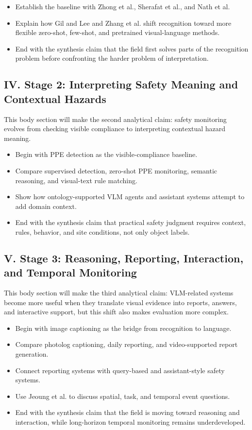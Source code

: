 \documentclass[10pt, letterpaper]{article}
\begin{document}
\begin{itemize}
\item Establish the baseline with Zhong et al., Sherafat et al., and Nath et al.
\item Explain how Gil and Lee and Zhang et al. shift recognition toward more flexible zero-shot, few-shot, and pretrained visual-language methods.
\item End with the synthesis claim that the field first solves parts of the recognition problem before confronting the harder problem of interpretation.
\end{itemize}

\subsection{IV. Stage 2: Interpreting Safety Meaning and Contextual Hazards}

This body section will make the second analytical claim: safety monitoring evolves from checking visible compliance to interpreting contextual hazard meaning.

\begin{itemize}
\item Begin with PPE detection as the visible-compliance baseline.
\item Compare supervised detection, zero-shot PPE monitoring, semantic reasoning, and visual-text rule matching.
\item Show how ontology-supported VLM agents and assistant systems attempt to add domain context.
\item End with the synthesis claim that practical safety judgment requires context, rules, behavior, and site conditions, not only object labels.
\end{itemize}

\subsection{V. Stage 3: Reasoning, Reporting, Interaction, and Temporal Monitoring}

This body section will make the third analytical claim: VLM-related systems become more useful when they translate visual evidence into reports, answers, and interactive support, but this shift also makes evaluation more complex.

\begin{itemize}
\item Begin with image captioning as the bridge from recognition to language.
\item Compare photolog captioning, daily reporting, and video-supported report generation.
\item Connect reporting systems with query-based and assistant-style safety systems.
\item Use Jeoung et al. to discuss spatial, task, and temporal event questions.
\item End with the synthesis claim that the field is moving toward reasoning and interaction, while long-horizon temporal monitoring remains underdeveloped.
\end{itemize}
\end{document}
